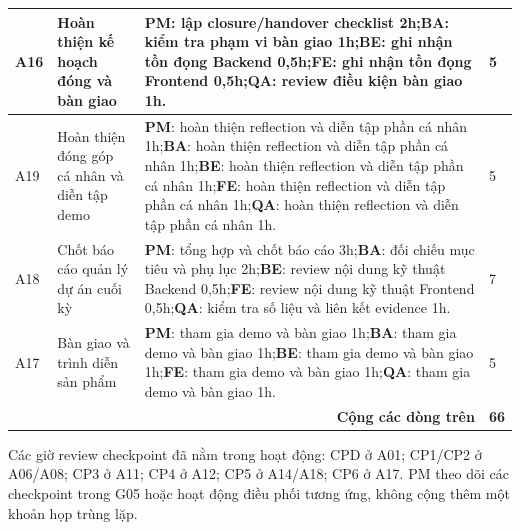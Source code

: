 \begin{table}[H]
\begin{tabularx}{\linewidth}{|p{0.8cm}|p{2.8cm}|>{\raggedright\arraybackslash}X|p{0.9cm}|}
A16 & Hoàn thiện kế hoạch đóng và bàn giao & \textbf{PM}: lập closure/handover checklist 2h;\newline \textbf{BA}: kiểm tra phạm vi bàn giao 1h;\newline \textbf{BE}: ghi nhận tồn đọng Backend 0,5h;\newline \textbf{FE}: ghi nhận tồn đọng Frontend 0,5h;\newline \textbf{QA}: review điều kiện bàn giao 1h. & 5 \\ \hline
A19 & Hoàn thiện đóng góp cá nhân và diễn tập demo & \textbf{PM}: hoàn thiện reflection và diễn tập phần cá nhân 1h;\newline \textbf{BA}: hoàn thiện reflection và diễn tập phần cá nhân 1h;\newline \textbf{BE}: hoàn thiện reflection và diễn tập phần cá nhân 1h;\newline \textbf{FE}: hoàn thiện reflection và diễn tập phần cá nhân 1h;\newline \textbf{QA}: hoàn thiện reflection và diễn tập phần cá nhân 1h. & 5 \\ \hline
A18 & Chốt báo cáo quản lý dự án cuối kỳ & \textbf{PM}: tổng hợp và chốt báo cáo 3h;\newline \textbf{BA}: đối chiếu mục tiêu và phụ lục 2h;\newline \textbf{BE}: review nội dung kỹ thuật Backend 0,5h;\newline \textbf{FE}: review nội dung kỹ thuật Frontend 0,5h;\newline \textbf{QA}: kiểm tra số liệu và liên kết evidence 1h. & 7 \\ \hline
A17 & Bàn giao và trình diễn sản phẩm & \textbf{PM}: tham gia demo và bàn giao 1h;\newline \textbf{BA}: tham gia demo và bàn giao 1h;\newline \textbf{BE}: tham gia demo và bàn giao 1h;\newline \textbf{FE}: tham gia demo và bàn giao 1h;\newline \textbf{QA}: tham gia demo và bàn giao 1h. & 5 \\ \hline
\multicolumn{3}{|r|}{\textbf{Cộng các dòng trên}} & \textbf{66} \\ \hline
\end{tabularx}
\end{table}

\noindent Các giờ review checkpoint đã nằm trong hoạt động: CPD ở A01; CP1/CP2 ở A06/A08; CP3 ở A11; CP4 ở A12; CP5 ở A14/A18; CP6 ở A17. PM theo dõi các checkpoint trong G05 hoặc hoạt động điều phối tương ứng, không cộng thêm một khoản họp trùng lặp.
\newpage
